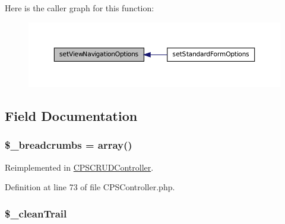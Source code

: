 Here is the caller graph for this function:\nopagebreak
\begin{figure}[H]
\begin{center}
\leavevmode
\includegraphics[width=396pt]{classCPSController_a592bdbc48efc56a00e5b49582db7c09f_icgraph}
\end{center}
\end{figure}




\subsection{Field Documentation}
\hypertarget{classCPSController_aa29f8061f06b0d1991b405eb2b5817fd}{
\subsubsection[{\$\_\-breadcrumbs}]{\setlength{\rightskip}{0pt plus 5cm}\$\_\-breadcrumbs = {\bf array}()}}
\label{classCPSController_aa29f8061f06b0d1991b405eb2b5817fd}


Reimplemented in \hyperlink{classCPSCRUDController_aa29f8061f06b0d1991b405eb2b5817fd}{CPSCRUDController}.



Definition at line 73 of file CPSController.php.

\hypertarget{classCPSController_a346b1f2edaa55ceb440e5eaef797e927}{
\subsubsection[{\$\_\-cleanTrail}]{\setlength{\rightskip}{0pt plus 5cm}\$\_\-cleanTrail}}
\label{classCPSController_a346b1f2edaa55ceb440e5eaef797e927}


